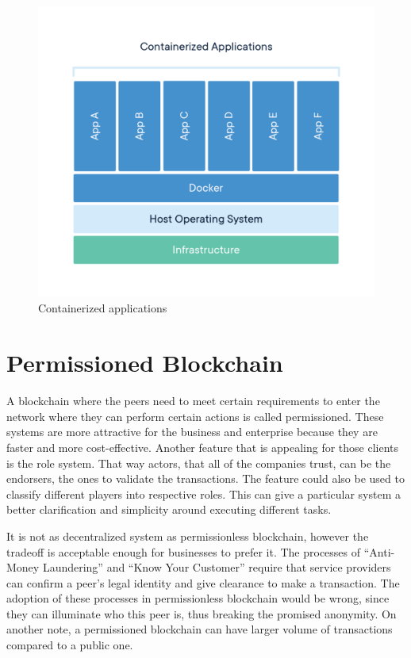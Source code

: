 \documentclass[a4paper,11pt]{report}
\begin{document}
\begin{figure}[h]
\centering
  \includegraphics[width = 16cm]{container-what-is-container.png}
  \caption{ Containerized applications \cite{dockerContainer}}
  \label{dockerEnvironment}
\end{figure}

\section{Permissioned Blockchain}
\label{permissionedBlockchain}
A blockchain where the peers need to meet certain requirements to enter the network where they can perform certain actions is called permissioned. These systems are more attractive for the business and enterprise because they are faster and more cost-effective. Another feature that is appealing for those clients is the role system. That way actors, that all of the companies trust, can be the endorsers, the ones to validate the transactions. The feature could also be used to classify different players into respective roles. This can give a particular system a better clarification and simplicity around executing different tasks. 

	It is not as decentralized system as permissionless blockchain, however the tradeoff is acceptable enough for businesses to prefer it. The processes of “Anti-Money Laundering” and “Know Your Customer” require that service providers can confirm a peer’s legal identity and give clearance to make a transaction. The adoption of these processes in permissionless blockchain would be wrong, since they can illuminate who this peer is, thus breaking the promised anonymity. On another note, a permissioned blockchain can have larger volume of transactions compared to a public one. 
	
\end{document}
